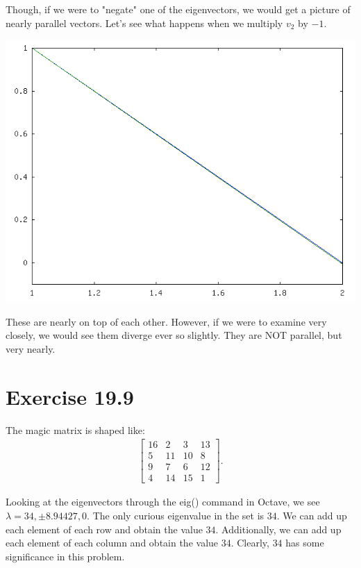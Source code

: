 \documentclass[11pt]{article}
\begin{document}
Though, if we were to "negate" one of the eigenvectors, we would get a picture of nearly
parallel vectors. Let's see what happens when we multiply $v_2$ by $-1$.
\begin{center}
\includegraphics[scale=0.5]{problem_19_8_negate.png}
\end{center}

These are nearly on top of each other. However, if we were to examine very closely, we
would see them diverge ever so slightly. They are NOT parallel, but very nearly.

\section*{Exercise 19.9}
The magic matrix is shaped like:
\begin{align*}
    \left[ \begin{array}{cccc}
     16 &   2 &   3 &  13\\
     5  & 11 &  10  &  8\\
     9  &  7 &   6  & 12\\
     4  & 14 &  15  &  1
    \end{array} \right].
\end{align*}

Looking at the eigenvectors through the eig() command in Octave, we see
$\lambda = 34, \pm 8.94427, 0$. The only curious eigenvalue in the set
is $34$. We can add up each element of each row and obtain the value $34$.
Additionally, we can add up each element of each column and obtain the value
$34$. Clearly, $34$ has some significance in this problem.
\end{document}
